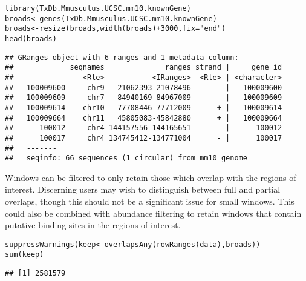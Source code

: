 \documentclass{report}\usepackage[]{graphicx}\usepackage[usenames,dvipsnames]{color}
\newcommand{\hlnum}[1]{\textcolor[rgb]{0.816,0.125,0.439}{#1}}%
\newcommand{\hlstr}[1]{\textcolor[rgb]{0.251,0.627,0.251}{#1}}%
\newcommand{\hlopt}[1]{\textcolor[rgb]{0,0,0}{#1}}%
\newcommand{\hlstd}[1]{\textcolor[rgb]{0.251,0.251,0.251}{#1}}%
\newcommand{\hlkwb}[1]{\textcolor[rgb]{0,0,0}{#1}}%
\newcommand{\hlkwc}[1]{\textcolor[rgb]{0.251,0.251,0.251}{#1}}%
\newcommand{\hlkwd}[1]{\textcolor[rgb]{0.878,0.439,0.125}{#1}}%
\newenvironment{knitrout}{}{} %
\begin{document}
\begin{knitrout}
\color{fgcolor}\begin{kframe}
\begin{alltt}
\hlkwd{library}\hlstd{(TxDb.Mmusculus.UCSC.mm10.knownGene)}
\hlstd{broads} \hlkwb{<-} \hlkwd{genes}\hlstd{(TxDb.Mmusculus.UCSC.mm10.knownGene)}
\hlstd{broads} \hlkwb{<-} \hlkwd{resize}\hlstd{(broads,} \hlkwd{width}\hlstd{(broads)}\hlopt{+}\hlnum{3000}\hlstd{,} \hlkwc{fix}\hlstd{=}\hlstr{"end"}\hlstd{)}
\hlkwd{head}\hlstd{(broads)}
\end{alltt}
\begin{verbatim}
## GRanges object with 6 ranges and 1 metadata column:
##             seqnames              ranges strand |     gene_id
##                <Rle>           <IRanges>  <Rle> | <character>
##   100009600     chr9   21062393-21078496      - |   100009600
##   100009609     chr7   84940169-84967009      - |   100009609
##   100009614    chr10   77708446-77712009      + |   100009614
##   100009664    chr11   45805083-45842880      + |   100009664
##      100012     chr4 144157556-144165651      - |      100012
##      100017     chr4 134745412-134771004      - |      100017
##   -------
##   seqinfo: 66 sequences (1 circular) from mm10 genome
\end{verbatim}
\end{kframe}
\end{knitrout}
 
Windows can be filtered to only retain those which overlap with the regions of interest. 
Discerning users may wish to distinguish between full and partial overlaps, though this should not be a significant issue for small windows.
This could also be combined with abundance filtering to retain windows that contain putative binding sites in the regions of interest.

\begin{knitrout}
\color{fgcolor}\begin{kframe}
\begin{alltt}
\hlkwd{suppressWarnings}\hlstd{(keep} \hlkwb{<-} \hlkwd{overlapsAny}\hlstd{(}\hlkwd{rowRanges}\hlstd{(data), broads))}
\hlkwd{sum}\hlstd{(keep)}
\end{alltt}
\begin{verbatim}
## [1] 2581579
\end{verbatim}
\end{kframe}
\end{knitrout}
\end{document}
